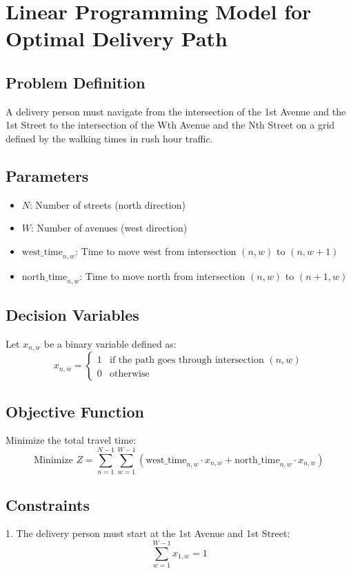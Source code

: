 \documentclass{article}
\begin{document}
\section*{Linear Programming Model for Optimal Delivery Path}

\subsection*{Problem Definition}
A delivery person must navigate from the intersection of the 1st Avenue and the 1st Street to the intersection of the Wth Avenue and the Nth Street on a grid defined by the walking times in rush hour traffic.

\subsection*{Parameters}
\begin{itemize}
    \item \( N \): Number of streets (north direction)
    \item \( W \): Number of avenues (west direction)
    \item \( \text{west\_time}_{n,w} \): Time to move west from intersection \((n, w)\) to \((n, w+1)\)
    \item \( \text{north\_time}_{n,w} \): Time to move north from intersection \((n, w)\) to \((n+1, w)\)
\end{itemize}

\subsection*{Decision Variables}
Let \( x_{n,w} \) be a binary variable defined as:
\[
x_{n,w} = 
\begin{cases} 
1 & \text{if the path goes through intersection } (n, w) \\ 
0 & \text{otherwise}
\end{cases}
\]

\subsection*{Objective Function}
Minimize the total travel time:
\[
\text{Minimize } Z = \sum_{n=1}^{N-1} \sum_{w=1}^{W-1} \left( \text{west\_time}_{n,w} \cdot x_{n,w} + \text{north\_time}_{n,w} \cdot x_{n,w} \right)
\]

\subsection*{Constraints}
1. The delivery person must start at the 1st Avenue and 1st Street:
   \[
   \sum_{w=1}^{W-1} x_{1,w} = 1
   \]
\end{document}
